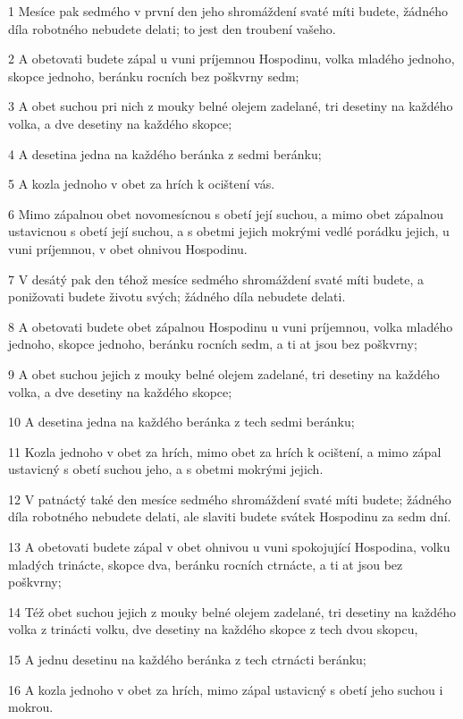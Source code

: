 \par 1 Mesíce pak sedmého v první den jeho shromáždení svaté míti budete, žádného díla robotného nebudete delati; to jest den troubení vašeho.
\par 2 A obetovati budete zápal u vuni príjemnou Hospodinu, volka mladého jednoho, skopce jednoho, beránku rocních bez poškvrny sedm;
\par 3 A obet suchou pri nich z mouky belné olejem zadelané, tri desetiny na každého volka, a dve desetiny na každého skopce;
\par 4 A desetina jedna na každého beránka z sedmi beránku;
\par 5 A kozla jednoho v obet za hrích k ocištení vás.
\par 6 Mimo zápalnou obet novomesícnou s obetí její suchou, a mimo obet zápalnou ustavicnou s obetí její suchou, a s obetmi jejich mokrými vedlé porádku jejich, u vuni príjemnou, v obet ohnivou Hospodinu.
\par 7 V desátý pak den téhož mesíce sedmého shromáždení svaté míti budete, a ponižovati budete životu svých; žádného díla nebudete delati.
\par 8 A obetovati budete obet zápalnou Hospodinu u vuni príjemnou, volka mladého jednoho, skopce jednoho, beránku rocních sedm, a ti at jsou bez poškvrny;
\par 9 A obet suchou jejich z mouky belné olejem zadelané, tri desetiny na každého volka, a dve desetiny na každého skopce;
\par 10 A desetina jedna na každého beránka z tech sedmi beránku;
\par 11 Kozla jednoho v obet za hrích, mimo obet za hrích k ocištení, a mimo zápal ustavicný s obetí suchou jeho, a s obetmi mokrými jejich.
\par 12 V patnáctý také den mesíce sedmého shromáždení svaté míti budete; žádného díla robotného nebudete delati, ale slaviti budete svátek Hospodinu za sedm dní.
\par 13 A obetovati budete zápal v obet ohnivou u vuni spokojující Hospodina, volku mladých trinácte, skopce dva, beránku rocních ctrnácte, a ti at jsou bez poškvrny;
\par 14 Též obet suchou jejich z mouky belné olejem zadelané, tri desetiny na každého volka z trinácti volku, dve desetiny na každého skopce z tech dvou skopcu,
\par 15 A jednu desetinu na každého beránka z tech ctrnácti beránku;
\par 16 A kozla jednoho v obet za hrích, mimo zápal ustavicný s obetí jeho suchou i mokrou.
